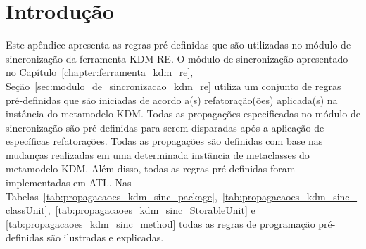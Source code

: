 \section{Introdução}

Este apêndice apresenta as regras pré-definidas que são utilizadas no módulo de sincronização da ferramenta KDM-RE. O módulo de sincronização apresentado no Capítulo~\ref{chapter:ferramenta_kdm_re}, Seção~\ref{sec:modulo_de_sincronizacao_kdm_re} utiliza um conjunto de regras pré-definidas que são iniciadas de acordo a(s) refatoração(ões) aplicada(s) na instância do metamodelo KDM. Todas as propagações especificadas no módulo de sincronização são pré-definidas para serem disparadas após a aplicação de específicas refatorações. Todas as propagações são definidas com base nas mudanças realizadas em uma determinada instância de metaclasses do metamodelo KDM. Além disso, todas as regras pré-definidas foram implementadas em ATL. Nas Tabelas~\ref{tab:propagacaoes_kdm_sinc_package},~\ref{tab:propagacaoes_kdm_sinc_classUnit},~\ref{tab:propagacaoes_kdm_sinc_StorableUnit} e \ref{tab:propagacaoes_kdm_sinc_method} todas as regras de programação pré-definidas são ilustradas e explicadas.  


